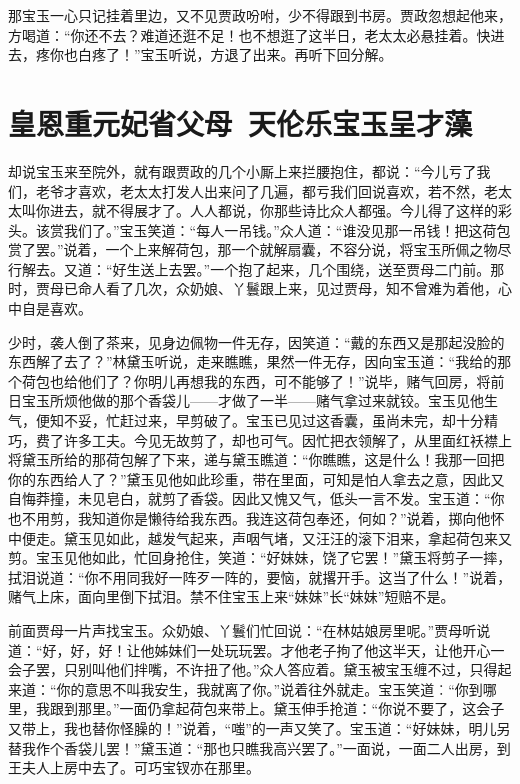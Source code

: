 \documentclass[12pt,oneside]{book}
\begin{document}
那宝玉一心只记挂着里边，又不见贾政吩咐，少不得跟到书房。贾政忽想起他来，方喝道：“你还不去？难道还逛不足！也不想逛了这半日，老太太必悬挂着。快进去，疼你也白疼了！”宝玉听说，方退了出来。再听下回分解。



\chapter{皇恩重元妃省父母~天伦乐宝玉呈才藻}
却说宝玉来至院外，就有跟贾政的几个小厮上来拦腰抱住，都说：“今儿亏了我们，老爷才喜欢，老太太打发人出来问了几遍，都亏我们回说喜欢，若不然，老太太叫你进去，就不得展才了。人人都说，你那些诗比众人都强。今儿得了这样的彩头。该赏我们了。”宝玉笑道：“每人一吊钱。”众人道：“谁没见那一吊钱！把这荷包赏了罢。”说着，一个上来解荷包，那一个就解扇囊，不容分说，将宝玉所佩之物尽行解去。又道：“好生送上去罢。”一个抱了起来，几个围绕，送至贾母二门前。那时，贾母已命人看了几次，众奶娘、丫鬟跟上来，见过贾母，知不曾难为着他，心中自是喜欢。

少时，袭人倒了茶来，见身边佩物一件无存，因笑道：“戴的东西又是那起没脸的东西解了去了？”林黛玉听说，走来瞧瞧，果然一件无存，因向宝玉道：“我给的那个荷包也给他们了？你明儿再想我的东西，可不能够了！”说毕，赌气回房，将前日宝玉所烦他做的那个香袋儿——才做了一半——赌气拿过来就铰。宝玉见他生气，便知不妥，忙赶过来，早剪破了。宝玉已见过这香囊，虽尚未完，却十分精巧，费了许多工夫。今见无故剪了，却也可气。因忙把衣领解了，从里面红袄襟上将黛玉所给的那荷包解了下来，递与黛玉瞧道：“你瞧瞧，这是什么！我那一回把你的东西给人了？”黛玉见他如此珍重，带在里面，可知是怕人拿去之意，因此又自悔莽撞，未见皂白，就剪了香袋。因此又愧又气，低头一言不发。宝玉道：“你也不用剪，我知道你是懒待给我东西。我连这荷包奉还，何如？”说着，掷向他怀中便走。黛玉见如此，越发气起来，声咽气堵，又汪汪的滚下泪来，拿起荷包来又剪。宝玉见他如此，忙回身抢住，笑道：“好妹妹，饶了它罢！”黛玉将剪子一摔，拭泪说道：“你不用同我好一阵歹一阵的，要恼，就撂开手。这当了什么！”说着，赌气上床，面向里倒下拭泪。禁不住宝玉上来“妹妹”长“妹妹”短赔不是。

前面贾母一片声找宝玉。众奶娘、丫鬟们忙回说：“在林姑娘房里呢。”贾母听说道：“好，好，好！让他姊妹们一处玩玩罢。才他老子拘了他这半天，让他开心一会子罢，只别叫他们拌嘴，不许扭了他。”众人答应着。黛玉被宝玉缠不过，只得起来道：“你的意思不叫我安生，我就离了你。”说着往外就走。宝玉笑道︰“你到哪里，我跟到那里。”一面仍拿起荷包来带上。黛玉伸手抢道：“你说不要了，这会子又带上，我也替你怪臊的！”说着，“嗤”的一声又笑了。宝玉道：“好妹妹，明儿另替我作个香袋儿罢！”黛玉道：“那也只瞧我高兴罢了。”一面说，一面二人出房，到王夫人上房中去了。可巧宝钗亦在那里。
\end{document}

